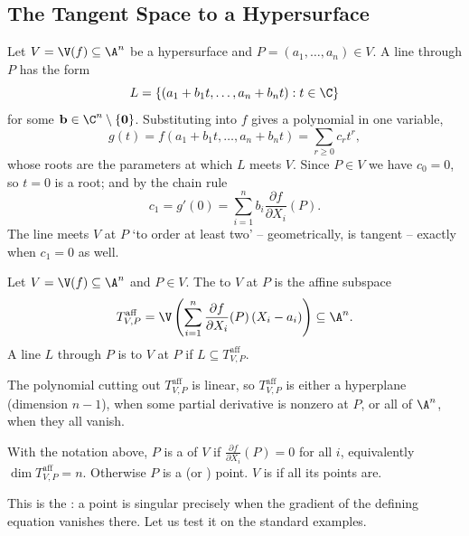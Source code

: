 \subsection{The Tangent Space to a Hypersurface}

Let $V = \V(f) \subseteq \A^n$ be a hypersurface and $P = (a_1,\dots,a_n) \in V$. A line through $P$ has the form
$$L = \{(a_1 + b_1t,\dots,a_n+b_nt) : t \in \C\}$$
for some $\mathbf b \in \C^n \setminus\{\mathbf 0\}$. Substituting into $f$ gives a polynomial in one variable,
$$g(t) = f(a_1+b_1t,\dots,a_n+b_nt) = \sum_{r \geq 0} c_r t^r,$$
whose roots are the parameters at which $L$ meets $V$. Since $P \in V$ we have $c_0 = 0$, so $t = 0$ is a root; and by the chain rule
$$c_1 = g'(0) = \sum_{i=1}^n b_i \frac{\partial f}{\partial X_i}(P).$$
The line meets $V$ at $P$ `to order at least two' -- geometrically, is tangent -- exactly when $c_1 = 0$ as well.

\begin{definition}
	Let $V = \V(f) \subseteq \A^n$ and $P \in V$. The  to $V$ at $P$ is the affine subspace
	$$T^{\mathrm{aff}}_{V,P} = \V\left(\sum_{i=1}^n \frac{\partial f}{\partial X_i}(P)\,(X_i - a_i)\right) \subseteq \A^n.$$
	A line $L$ through $P$ is  to $V$ at $P$ if $L \subseteq T^{\mathrm{aff}}_{V,P}$.
\end{definition}

The polynomial cutting out $T^{\mathrm{aff}}_{V,P}$ is linear, so $T^{\mathrm{aff}}_{V,P}$ is either a hyperplane (dimension $n-1$), when some partial derivative is nonzero at $P$, or all of $\A^n$, when they all vanish.

\begin{definition}
	With the notation above, $P$ is a  of $V$ if $\frac{\partial f}{\partial X_i}(P) = 0$ for all $i$, equivalently $\dim T^{\mathrm{aff}}_{V,P} = n$. Otherwise $P$ is a  (or ) point. $V$ is  if all its points are.
\end{definition}

This is the : a point is singular precisely when the gradient of the defining equation vanishes there. Let us test it on the standard examples.

